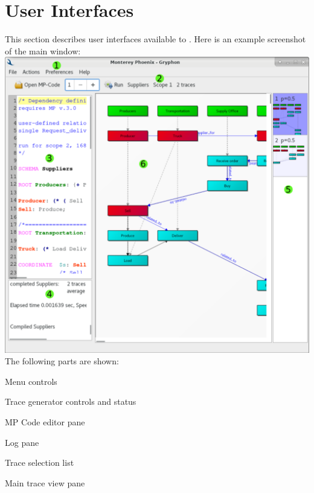 \documentclass[11pt,fleqn]{article} %
\begin{document}
\section{\ggui User Interfaces}
This section describes user interfaces available to \ggui.
Here is an example screenshot of the \ggui main window:\\
\includegraphics[scale=.65]{screenshots/main_window_sectioned}\\
The following parts are shown:
\begin{compactenum}
\item Menu controls
\item Trace generator controls and status
\item MP Code editor pane
\item Log pane
\item Trace selection list
\item Main trace view pane
\end{compactenum}
\end{document}
